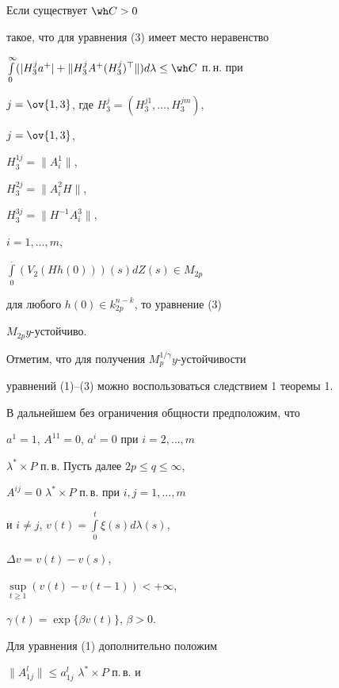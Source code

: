 \begin{cor}


Если существует $\wh C > 0$ 


такое, что для уравнения (3) имеет место неравенство 


$\int \limits_0^\infty (|H_3^ja^+| + 


\|H_3^jA^+(H_3^j)^\top \|)d\lambda \le \wh C$ п.\,н. при 


$j = \ov{1,3}$, где $H_3^j = (H_3^{j1},\dotsc, H_3^{jm})$, 


$j = \ov{1,3}$, 


$H_3^{1j} = \|A_i^1\|$, 


$H_3^{2j} = \|A_i^2H\|$, 


$H_3^{3j} = \|H^{-1}A_i^3\|$, 


$i = 1,\dotsc, m$, 


$\int \limits_0^{\displaystyle .}(V_2(Hh(0)))(s)dZ(s) \in M_{2p}$ 


для любого $h(0) \in k_{2p}^{n-k}$, то уравнение (3) 


$M_{2p}y$-устойчиво.


\end{cor}





Отметим, что для получения $M_p^{1/\gamma }y$-устойчивости 


уравнений (1)--(3) можно воспользоваться следствием 1 теоремы 1.





В дальнейшем без ограничения общности предположим, что 


$a^1 = 1$, $A^{11} = 0$, $a^i = 0$ при $i = 2,\dotsc, m$ 


$\lambda^*\times P$ п.\,в. Пусть далее $2p \le q \le \infty$, 


$A^{ij} = 0$\; $\lambda^*\times P$ п.\,в. при $i, j = 1,\dotsc, m$ 


и $i \ne j$, $v(t) = \int \limits_0^t\xi (s)d\lambda (s)$, 


$\Delta v = v(t) - v(s)$, 


$\sup \limits_{t\ge 1}(v(t) - v(t - 1)) < +\infty$,


$\gamma (t) = \exp \{\beta v(t)\}$, $\beta > 0$. 





Для уравнения (1) дополнительно положим


$\|A^l_{1j}\| \le a^l_{1j}$\; $\lambda^*\times P$ п.\,в. и 


